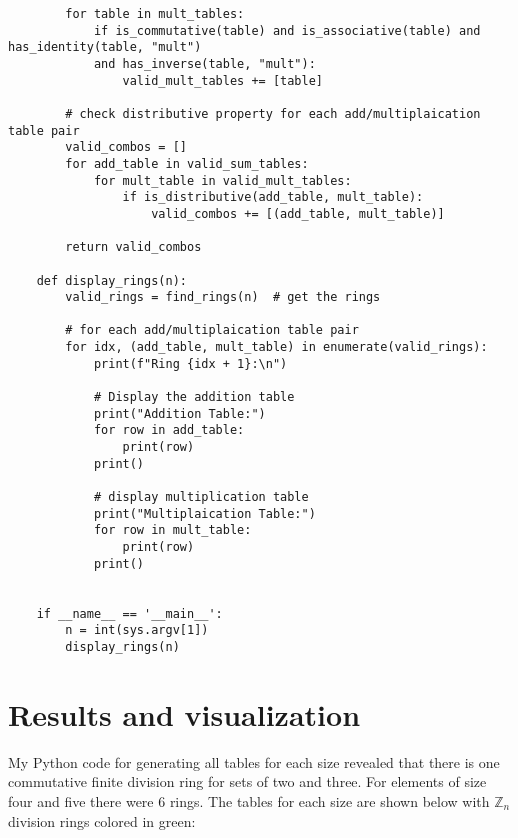 \documentclass{article}
\begin{document}
\begin{verbatim}
        for table in mult_tables:
            if is_commutative(table) and is_associative(table) and has_identity(table, "mult")
            and has_inverse(table, "mult"):
                valid_mult_tables += [table]
    
        # check distributive property for each add/multiplaication table pair
        valid_combos = []
        for add_table in valid_sum_tables:
            for mult_table in valid_mult_tables:
                if is_distributive(add_table, mult_table):
                    valid_combos += [(add_table, mult_table)]
    
        return valid_combos
    
    def display_rings(n):
        valid_rings = find_rings(n)  # get the rings
    
        # for each add/multiplaication table pair
        for idx, (add_table, mult_table) in enumerate(valid_rings):
            print(f"Ring {idx + 1}:\n")
    
            # Display the addition table
            print("Addition Table:")
            for row in add_table:
                print(row)
            print()
    
            # display multiplication table
            print("Multiplaication Table:")
            for row in mult_table:
                print(row)
            print()
    
    
    if __name__ == '__main__':
        n = int(sys.argv[1])
        display_rings(n)         
\end{verbatim}

\section{Results and visualization}
My Python code for generating all tables for each size revealed that there is one commutative finite division ring for sets of two and three. For elements of size four and five there were 6 rings. The tables for each size are shown below with $\mathbb{Z}_n$ division rings colored in green:
\end{document}
